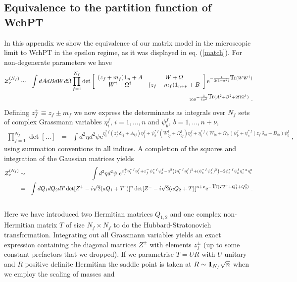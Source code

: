 \documentclass[11pt]{article}
\newcommand{\bea}{\begin{eqnarray}}
\newcommand{\eea}{\end{eqnarray}}
\newcommand{\nn}{\nonumber}
\newcommand{\eins}{\leavevmode\hbox{\small1\kern-3.8pt\normalsize1}}
\newcommand{\e}{\mbox{e}}
\newcommand{\sect}[1]{\setcounter{equation}{0}\section{#1}}
\def\Tr{{\mbox{Tr}}}
\begin{document}
\begin{appendix}

\sect{Equivalence to the partition function of WchPT}\label{equiv}

In this appendix we show the equivalence of our matrix model in the
microscopic limit to WchPT in the epsilon regime, as it was displayed
in eq. (\ref{match}). For non-degenerate parameters we have 
\bea
{\cal Z}_{\nu}^{(N_f)}
&\sim&\int dAdBdWd\Omega
\prod_{f=1}^{N_f}\det\left[
\begin{array}{cc}
(z_f+m_f)\eins_n+A & W+\Omega\\
W^\dag+\Omega^\dag & (z_f-m_f)\eins_{n+\nu}+B\\
\end{array}
\right]\e^{-\frac{1}{2(1-a^2)}\Tr(WW^\dag)}
\nn\\
&&\times \e^{-\frac{1}{4a^2}\Tr(A^2+B^2+2\Omega\Omega^\dag)}\ .
\eea
Defining $z_f^\pm\equiv z_f\pm m_f$ we now express the determinants
as integrals over $N_f$ sets of complex Grassmann
variables $\eta_i^f$, $i=1,\ldots,n$ and $\psi_b^f$, $b=1,\ldots,n+\nu$,
\bea
\prod_{f=1}^{N_f}\det[\ldots]&=& \int d^2\eta d^2\psi
\e^{\eta_i^{*\,f}(z^+_f\delta_{ij}+A_{ij})\eta_j^f
+\psi^{*\,f}_b(W_{bj}^\dag+\Omega_{bj}^\dag)\eta_i^f
+\eta_i^{*\,f}(W_{ib}+\Omega_{ib})\psi_b^f
+\psi^{*\,f}_c(z_f^-\delta_{cb}+B_{cb})\psi_b^f
}\ ,\ \ \ \ 
\eea
using summation conventions in all indices.
A completion of the squares and integration of the Gaussian matrices yields
\bea
{\cal Z}_{\nu}^{(N_f)}
&\sim&
\int d^2\eta d^2\psi\
e^{z^+_f\eta^{*\,f}_i\eta_i^f + z^-_f \psi^{*\,f}_b\psi_b^f-a^2
\left((\eta^{*\,f}_i\eta_i^f)^2+(\psi^{*\,f}_b\psi_b^f)^2\right)
-2\psi^{*\,f}_b\psi_b^f\eta^{*\,g}_i\eta_i^g}\nn\\
&=&\int dQ_1dQ_2dT \det[Z^+-i\sqrt{2}(aQ_1+T^\dag)]^n
\det[Z^- -i\sqrt{2}(aQ_2+T)]^{n+\nu}
\e^{-\Tr (TT^\dag+Q_1^2+Q_2^2)}\ .\nn\\
&&
\label{ZINfexact}
\eea
Here we have introduced two Hermitian matrices $Q_{1,2}$ and one
complex non-Hermitian matrix $T$ of size $N_f\times N_f$ 
to do the Hubbard-Stratonovich transformation. Integrating out all
Grassmann variables yields an exact expression containing the diagonal
matrices $Z^\pm$ with elements $z_f^\pm$ (up to some constant prefactors that we
dropped). If we parametrise $T=UR$ with $U$ unitary and $R$ positive
definite Hermitian the saddle point is taken at
$R\sim\eins_{N_f}\sqrt{n}$ when we employ the scaling of masses and

\end{appendix}
\end{document}

